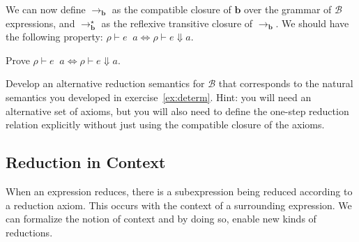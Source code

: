 \documentclass[11pt]{article}
\newcommand\menv{\rho}
\newcommand\mans{a}
\newcommand\mexp{e}
\newcommand\beval[3]{{#1} \vdash {#2} \Downarrow {#3}}
\newcommand\breducename{\mathbf{b}}
\newcommand\bstepname{\rightarrow_{\breducename}}
\newcommand\bmultistepname{\rightarrow^\star_{\breducename}}
\newcommand\Barith{\mathcal{B}}
\begin{document}
We can now define $\bstepname$ as the compatible closure of
$\breducename$ over the grammar of $\Barith$ expressions, and
$\bmultistepname$ as the reflexive transitive closure of $\bstepname$.
We should have the following property:
$\menv\vdash\mexp\mathop{\bmultistepname}\mans \iff \beval\menv\mexp\mans$.

\begin{exercise}
Prove $\menv\vdash\mexp\mathop{\bmultistepname}\mans \iff \beval\menv\mexp\mans$.
\end{exercise}

\begin{exercise}
Develop an alternative reduction semantics for $\Barith$ that
corresponds to the natural semantics you developed in
exercise~\ref{ex:determ}.  Hint: you will need an alternative set of
axioms, but you will also need to define the one-step reduction
relation explicitly without just using the compatible closure of the axioms.
\end{exercise}

\subsection{Reduction in Context}

When an expression reduces, there is a subexpression being reduced
according to a reduction axiom.  This occurs with the context of a
surrounding expression.  We can formalize the notion of context
and by doing so, enable new kinds of reductions.
\end{document}

